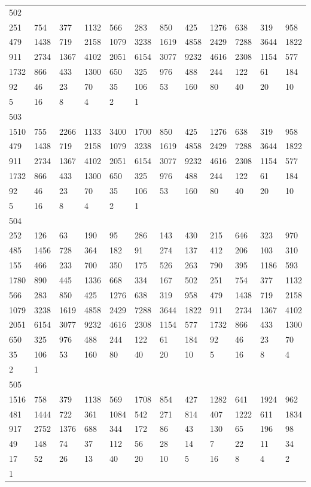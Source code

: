 \begin{longtable}{llllllllllll}
502&&&&&&&&&&&\\
251& 754& 377& 1132& 566& 283& 850& 425& 1276& 638& 319& 958\\
479& 1438& 719& 2158& 1079& 3238& 1619& 4858& 2429& 7288& 3644& 1822\\
911& 2734& 1367& 4102& 2051& 6154& 3077& 9232& 4616& 2308& 1154& 577\\
1732& 866& 433& 1300& 650& 325& 976& 488& 244& 122& 61& 184\\
92& 46& 23& 70& 35& 106& 53& 160& 80& 40& 20& 10\\
5& 16& 8& 4& 2& 1& \\

503&&&&&&&&&&&\\
1510& 755& 2266& 1133& 3400& 1700& 850& 425& 1276& 638& 319& 958\\
479& 1438& 719& 2158& 1079& 3238& 1619& 4858& 2429& 7288& 3644& 1822\\
911& 2734& 1367& 4102& 2051& 6154& 3077& 9232& 4616& 2308& 1154& 577\\
1732& 866& 433& 1300& 650& 325& 976& 488& 244& 122& 61& 184\\
92& 46& 23& 70& 35& 106& 53& 160& 80& 40& 20& 10\\
5& 16& 8& 4& 2& 1& \\

504&&&&&&&&&&&\\
252& 126& 63& 190& 95& 286& 143& 430& 215& 646& 323& 970\\
485& 1456& 728& 364& 182& 91& 274& 137& 412& 206& 103& 310\\
155& 466& 233& 700& 350& 175& 526& 263& 790& 395& 1186& 593\\
1780& 890& 445& 1336& 668& 334& 167& 502& 251& 754& 377& 1132\\
566& 283& 850& 425& 1276& 638& 319& 958& 479& 1438& 719& 2158\\
1079& 3238& 1619& 4858& 2429& 7288& 3644& 1822& 911& 2734& 1367& 4102\\
2051& 6154& 3077& 9232& 4616& 2308& 1154& 577& 1732& 866& 433& 1300\\
650& 325& 976& 488& 244& 122& 61& 184& 92& 46& 23& 70\\
35& 106& 53& 160& 80& 40& 20& 10& 5& 16& 8& 4\\
2& 1& \\

505&&&&&&&&&&&\\
1516& 758& 379& 1138& 569& 1708& 854& 427& 1282& 641& 1924& 962\\
481& 1444& 722& 361& 1084& 542& 271& 814& 407& 1222& 611& 1834\\
917& 2752& 1376& 688& 344& 172& 86& 43& 130& 65& 196& 98\\
49& 148& 74& 37& 112& 56& 28& 14& 7& 22& 11& 34\\
17& 52& 26& 13& 40& 20& 10& 5& 16& 8& 4& 2\\
1& \\


\end{longtable}
